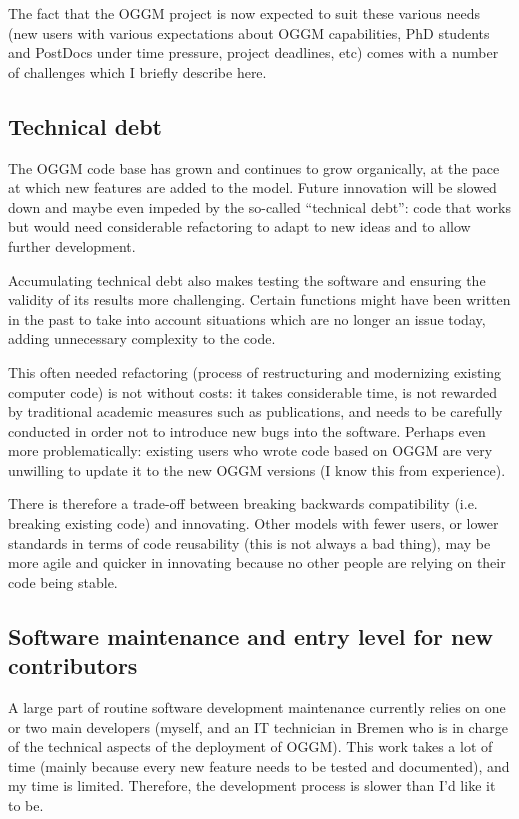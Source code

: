 The fact that the OGGM project is now expected to suit these various needs
(new users with various expectations about OGGM capabilities, PhD students and PostDocs under time pressure,
project deadlines, etc) comes with a number of challenges which I briefly describe here.


\subsection{Technical debt}

The OGGM code base has grown and continues to grow organically, at the pace at which new features are added to the
model. Future innovation will be slowed down and maybe even impeded by the so-called “technical debt”: code that works
but would need considerable refactoring to adapt to new ideas and to allow further development.

Accumulating technical debt also makes testing the software and ensuring the validity of its results more challenging.
Certain functions might have been written in the past to take into account situations which are no longer an issue
today, adding unnecessary complexity to the code.

This often needed refactoring (process of restructuring and modernizing existing computer code)
is not without costs: it takes considerable time, is not rewarded by traditional academic measures such as publications,
and needs to be carefully conducted in order not to introduce new bugs into the software. Perhaps even more
problematically: existing users who wrote code based on OGGM are very unwilling to update it to the new OGGM versions (I
know this from experience).

There is therefore a trade-off between breaking backwards compatibility (i.e. breaking existing code) and
innovating. Other models with fewer users, or lower standards in terms of code reusability (this is not always a bad thing),
may be more agile and quicker in innovating because no other people are relying on their code being stable.


\subsection{Software maintenance and entry level for new contributors}

A large part of routine software development maintenance currently relies on one or two main developers (myself, and an
IT technician in Bremen who is in charge of the technical aspects of the deployment of OGGM).
This work takes a lot of time (mainly because every new feature needs to be tested and documented), and my time is
limited. Therefore, the development process is slower than I’d like it to be.

